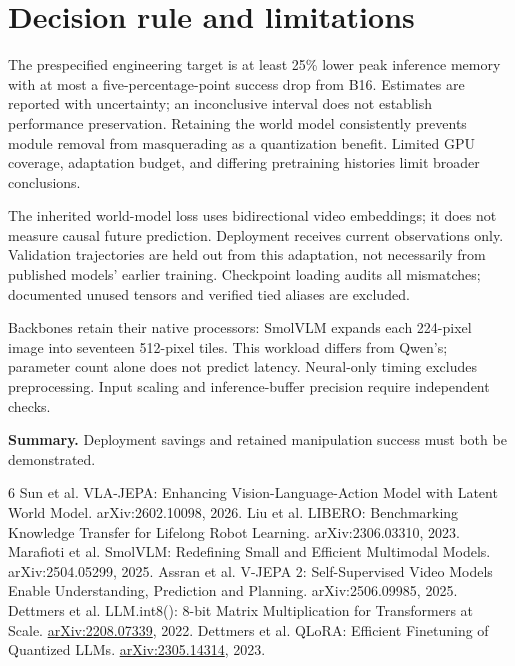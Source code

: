 \documentclass[10pt,a4paper]{article}
\begin{document}
\FloatBarrier
\section{Decision rule and limitations}
The prespecified engineering target is at least 25\% lower peak inference memory with at most a five-percentage-point success drop from B16. Estimates are reported with uncertainty; an inconclusive interval does not establish performance preservation. Retaining the world model consistently prevents module removal from masquerading as a quantization benefit. Limited GPU coverage, adaptation budget, and differing pretraining histories limit broader conclusions.

The inherited world-model loss uses bidirectional video embeddings; it does not measure causal future prediction. Deployment receives current observations only. Validation trajectories are held out from this adaptation, not necessarily from published models' earlier training. Checkpoint loading audits all mismatches; documented unused tensors and verified tied aliases are excluded.

Backbones retain their native processors: SmolVLM expands each 224-pixel image into seventeen 512-pixel tiles. This workload differs from Qwen's; parameter count alone does not predict latency. Neural-only timing excludes preprocessing. Input scaling and inference-buffer precision require independent checks.

\textbf{Summary.} Deployment savings and retained manipulation success must both be demonstrated.

\begin{thebibliography}{6}\small\setlength{\itemsep}{1pt}
 Sun et al. VLA-JEPA: Enhancing Vision-Language-Action Model with Latent World Model. arXiv:2602.10098, 2026.
 Liu et al. LIBERO: Benchmarking Knowledge Transfer for Lifelong Robot Learning. arXiv:2306.03310, 2023.
 Marafioti et al. SmolVLM: Redefining Small and Efficient Multimodal Models. arXiv:2504.05299, 2025.
 Assran et al. V-JEPA 2: Self-Supervised Video Models Enable Understanding, Prediction and Planning. arXiv:2506.09985, 2025.
 Dettmers et al. LLM.int8(): 8-bit Matrix Multiplication for Transformers at Scale. \href{https://arxiv.org/abs/2208.07339}{arXiv:2208.07339}, 2022.
 Dettmers et al. QLoRA: Efficient Finetuning of Quantized LLMs. \href{https://arxiv.org/abs/2305.14314}{arXiv:2305.14314}, 2023.
\end{thebibliography}
\end{document}
